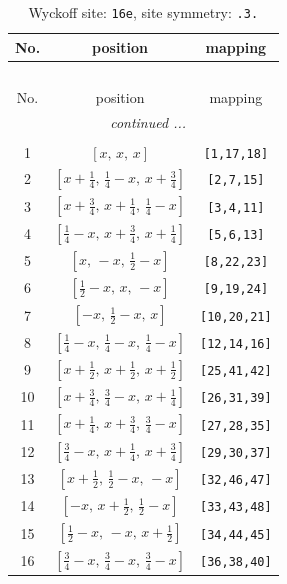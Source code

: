 \documentclass[fleqn,8pt]{jsarticle}
\begin{document}
\begin{longtable}{ccc}
\caption{Wyckoff site: {\tt 16e}, site symmetry: {\tt .3.}}
 \\
 \hline \hline
No. & position & mapping \\ \hline \endfirsthead

\multicolumn{2}{l}{\tablename\ \thetable{}} \\
 \hline \hline
No. & position & mapping \\ \hline \endhead

 \hline \hline
\multicolumn{2}{r}{\footnotesize\it continued ...} \\ \endfoot

 \hline \hline
\multicolumn{2}{r}{} \\ \endlastfoot

1 & $\left[ x,\, x,\, x \right]$ & {\tt [1,17,18]} \\ \hline
2 & $\left[ x + \frac{1}{4},\, \frac{1}{4} - x,\, x + \frac{3}{4} \right]$ & {\tt [2,7,15]} \\ \hline
3 & $\left[ x + \frac{3}{4},\, x + \frac{1}{4},\, \frac{1}{4} - x \right]$ & {\tt [3,4,11]} \\ \hline
4 & $\left[ \frac{1}{4} - x,\, x + \frac{3}{4},\, x + \frac{1}{4} \right]$ & {\tt [5,6,13]} \\ \hline
5 & $\left[ x,\, - x,\, \frac{1}{2} - x \right]$ & {\tt [8,22,23]} \\ \hline
6 & $\left[ \frac{1}{2} - x,\, x,\, - x \right]$ & {\tt [9,19,24]} \\ \hline
7 & $\left[ - x,\, \frac{1}{2} - x,\, x \right]$ & {\tt [10,20,21]} \\ \hline
8 & $\left[ \frac{1}{4} - x,\, \frac{1}{4} - x,\, \frac{1}{4} - x \right]$ & {\tt [12,14,16]} \\ \hline
9 & $\left[ x + \frac{1}{2},\, x + \frac{1}{2},\, x + \frac{1}{2} \right]$ & {\tt [25,41,42]} \\ \hline
10 & $\left[ x + \frac{3}{4},\, \frac{3}{4} - x,\, x + \frac{1}{4} \right]$ & {\tt [26,31,39]} \\ \hline
11 & $\left[ x + \frac{1}{4},\, x + \frac{3}{4},\, \frac{3}{4} - x \right]$ & {\tt [27,28,35]} \\ \hline
12 & $\left[ \frac{3}{4} - x,\, x + \frac{1}{4},\, x + \frac{3}{4} \right]$ & {\tt [29,30,37]} \\ \hline
13 & $\left[ x + \frac{1}{2},\, \frac{1}{2} - x,\, - x \right]$ & {\tt [32,46,47]} \\ \hline
14 & $\left[ - x,\, x + \frac{1}{2},\, \frac{1}{2} - x \right]$ & {\tt [33,43,48]} \\ \hline
15 & $\left[ \frac{1}{2} - x,\, - x,\, x + \frac{1}{2} \right]$ & {\tt [34,44,45]} \\ \hline
16 & $\left[ \frac{3}{4} - x,\, \frac{3}{4} - x,\, \frac{3}{4} - x \right]$ & {\tt [36,38,40]} \\
\end{longtable}
\end{document}
